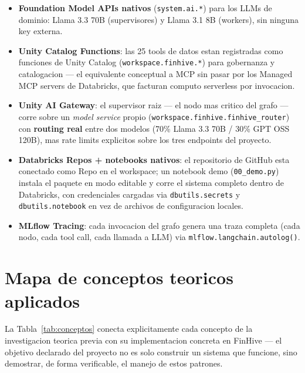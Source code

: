 \documentclass[11pt]{article}
\begin{document}
\begin{itemize}[leftmargin=*]
  \item \textbf{Foundation Model APIs nativos} (\texttt{system.ai.*}) para los
  LLMs de dominio: Llama 3.3 70B (supervisores) y Llama 3.1 8B (workers), sin
  ninguna key externa.
  \item \textbf{Unity Catalog Functions}: las 25 tools de datos estan
  registradas como funciones de Unity Catalog (\texttt{workspace.finhive.*})
  para gobernanza y catalogacion --- el equivalente conceptual a MCP sin
  pasar por los Managed MCP servers de Databricks, que facturan computo
  serverless por invocacion.
  \item \textbf{Unity AI Gateway}: el supervisor raiz --- el nodo mas critico
  del grafo --- corre sobre un \emph{model service} propio
  (\texttt{workspace.finhive.finhive\_router}) con \textbf{routing real}
  entre dos modelos (70\% Llama 3.3 70B / 30\% GPT OSS 120B), mas rate
  limits explicitos sobre los tres endpoints del proyecto.
  \item \textbf{Databricks Repos + notebooks nativos}: el repositorio de
  GitHub esta conectado como Repo en el workspace; un notebook demo
  (\texttt{00\_demo.py}) instala el paquete en modo editable y corre el
  sistema completo dentro de Databricks, con credenciales cargadas via
  \texttt{dbutils.secrets} y \texttt{dbutils.notebook} en vez de archivos de
  configuracion locales.
  \item \textbf{MLflow Tracing}: cada invocacion del grafo genera una traza
  completa (cada nodo, cada tool call, cada llamada a LLM) via
  \texttt{mlflow.langchain.autolog()}.
\end{itemize}

\section{Mapa de conceptos teoricos aplicados}

La Tabla~\ref{tab:conceptos} conecta explicitamente cada concepto de la
investigacion teorica previa con su implementacion concreta en FinHive --- el
objetivo declarado del proyecto no es solo construir un sistema que funcione,
sino demostrar, de forma verificable, el manejo de estos patrones.
\end{document}
